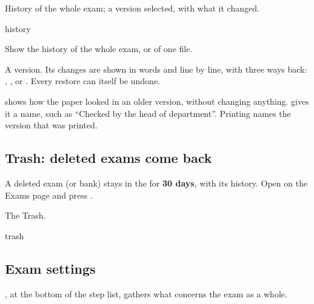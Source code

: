 \documentclass[11pt]{article}
\begin{document}
\begin{keep}
\begin{guidefig}{History of the whole exam; a version selected, with what it changed.}
\begin{shot}{history}
\end{shot}
\end{guidefig}
\begin{callouts}
  \item Show the history of the whole exam, or of one file.
  \item A version. Its changes are shown in words and line by line, with three ways back: , , or . Every restore can itself be undone.
\end{callouts}
\end{keep}

\begin{tip}
 shows how the paper looked in an older version, without changing anything.  gives it a name, such as ``Checked by the head of department''. Printing names the version that was printed.
\end{tip}

\subsection{Trash: deleted exams come back}

A deleted exam (or bank) stays in the  for \textbf{30 days}, with its history. Open  on the Exams page and press .

\begin{guidefig}{The Trash.}
\begin{shot}[0.55\linewidth]{trash}
\end{shot}
\end{guidefig}

\subsection{Exam settings}\label{sec:settings}

, at the bottom of the step list, gathers what concerns the exam as a whole.
\end{document}
